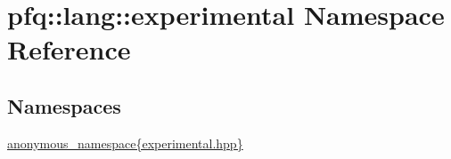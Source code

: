 \hypertarget{namespacepfq_1_1lang_1_1experimental}{}\section{pfq\+:\+:lang\+:\+:experimental Namespace Reference}
\label{namespacepfq_1_1lang_1_1experimental}
\subsection*{Namespaces}
\begin{DoxyCompactItemize}
\item 
 \hyperlink{namespacepfq_1_1lang_1_1experimental_1_1anonymous__namespace_02experimental_8hpp_03}{anonymous\+\_\+namespace\{experimental.\+hpp\}}
\end{DoxyCompactItemize}
